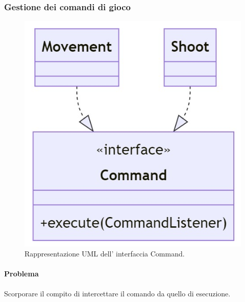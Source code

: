 \documentclass[a4paper,12pt]{report}
\begin{document}
\subsubsection*{Gestione dei comandi di gioco}
%
\begin{figure}[H]
	\centering{}
	\includegraphics[scale=0.4]{img/command.jpg}
	\caption{Rappresentazione UML dell' interfaccia Command.}
	\label{img:strategy}
	\end{figure}
%	
\paragraph*{Problema} Scorporare il compito di intercettare il comando da quello di esecuzione.
%
\end{document}
